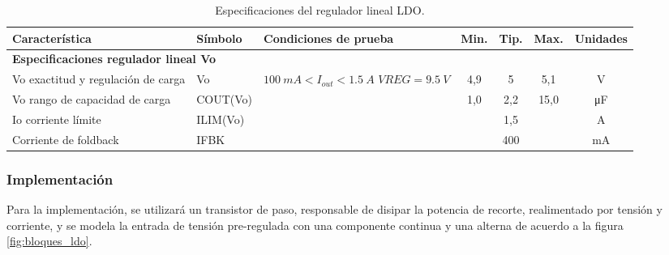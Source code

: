 \documentclass[]{article}
\begin{document}
	\begin{table}[h]
		\centering
		\renewcommand{\arraystretch}{1.5}
		\begin{tabular}{|p{3cm}|l|p{5cm}|c|c|c|c|}
			\hline
			\textbf{Característica} & \textbf{Símbolo} & \textbf{Condiciones de prueba} & \textbf{Min.} & \textbf{Tip.} & \textbf{Max.} & \textbf{Unidades} \\
			\hline
			
			\multicolumn{7}{|l|}{\textbf{Especificaciones regulador lineal Vo}} \\
			\hline
			
			Vo exactitud y regulación de carga & Vo & $\SI{100}{mA} < I_{out} < \SI{1.5}{A}$ \break $VREG = \SI{9.5}{V}$ & 4,9 & 5 & 5,1 & V \\
			\hline
			
			Vo rango de capacidad de carga & COUT(Vo) &  & 1,0 & 2,2 & 15,0 & \si{\micro\farad} \\
			\hline
			
			Io corriente límite & ILIM(Vo) &  &  & 1,5 &  & A \\
			\hline
			
			Corriente de foldback & IFBK &  &  & 400 &  & \si{mA} \\
			\hline
		
		\end{tabular}
		
		\caption{Especificaciones del regulador lineal LDO.}
		\label{tabla:especificaciones_ldo}
	\end{table}
	
	\subsubsection{Implementación}
	
Para la implementación, se utilizará un transistor de paso, responsable de disipar la potencia de recorte, realimentado por tensión y corriente, y se modela la entrada de tensión pre-regulada con una componente continua y una alterna de acuerdo a la figura \ref{fig:bloques_ldo}.
\end{document}
